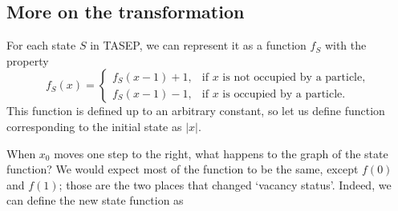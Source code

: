 \subsection*{More on the transformation}
For each state $S$ in TASEP, we can represent it as a function $f_S$ with the property \[
f_S (x) = \begin{cases*}
    f_S(x-1)+1, & \text{if }x \text{ is not occupied by a particle},\\
    f_S(x-1)-1, & \text{if }x \text{ is occupied by a particle}.
\end{cases*}
\]
This function is defined up to an arbitrary constant, so let us define function corresponding to the initial state as $|x|$.
\begin{center}
\end{center}
When $x_0$ moves one step to the right, what happens to the graph of the state function? We would expect most of the function to be the same, except $f(0)$ and $f(1)$; those are the two places that changed `vacancy status'. Indeed, we can define the new state function as 
\begin{center}
\end{center} 

